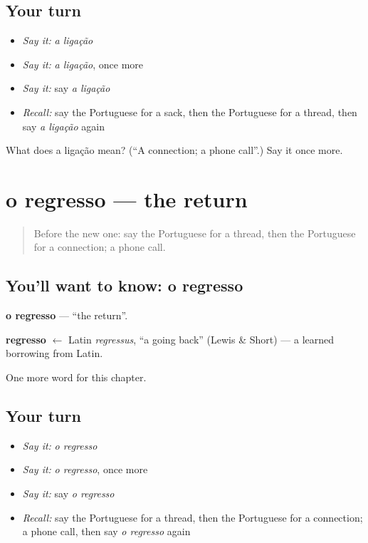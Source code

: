 \subsection*{Your turn}
\begin{itemize}
\raggedright
  \item \emph{Say it:} \emph{a ligação}
  \item \emph{Say it:} \emph{a ligação}, once more
  \item \emph{Say it:} say \emph{a ligação}
  \item \emph{Recall:} say the Portuguese for a sack, then the Portuguese for a thread, then say \emph{a ligação} again
\end{itemize}

\begin{tcolorbox}[breakable,colback=teal!4,colframe=teal!35!black,title={Before you move on}]
What does a ligação mean? (\textquotedblleft{}A connection; a phone call\textquotedblright{}.) Say it once more.
\end{tcolorbox}
\section[o regresso]{o regresso — the return}

\label{lesson:PT-C166-regresso}



\begin{quote}
Before the new one: say the Portuguese for a thread, then the Portuguese for a connection; a phone call.
\end{quote}

\subsection*{You'll want to know: o regresso}
\textbf{o regresso} — \textquotedblleft{}the return\textquotedblright{}.

\begin{cousinweb}
\textbf{regresso} $\leftarrow$ Latin \emph{regressus}, \textquotedblleft{}a going back\textquotedblright{} (Lewis \& Short) — a learned borrowing from Latin.
\end{cousinweb}

\begin{grammarlens}[title={What you've built}]
One more word for this chapter.
\end{grammarlens}

\subsection*{Your turn}
\begin{itemize}
\raggedright
  \item \emph{Say it:} \emph{o regresso}
  \item \emph{Say it:} \emph{o regresso}, once more
  \item \emph{Say it:} say \emph{o regresso}
  \item \emph{Recall:} say the Portuguese for a thread, then the Portuguese for a connection; a phone call, then say \emph{o regresso} again
\end{itemize}

